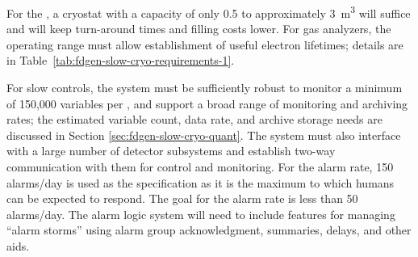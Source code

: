 For the , a cryostat with a capacity of only \num{0.5} to approximately \SI{3}{m^3} %
will suffice and will keep turn-around times and filling costs %
lower. %
For gas analyzers, the operating range must allow establishment of useful electron lifetimes;
details  are in Table~\ref{tab:fdgen-slow-cryo-requirements-1}.

For slow controls, the system must
be sufficiently robust to monitor 
a minimum of 150,000 variables per , and 
support a broad range of monitoring and archiving rates;
the estimated variable count, data rate, and archive storage needs
are discussed in Section \ref{sec:fdgen-slow-cryo-quant}.
The system must also
interface with a large number of detector subsystems and
establish two-way communication with them for control and monitoring. 
For the alarm rate, 150 alarms/day is used as the specification as it is the maximum to which humans can be expected to respond. The goal for the alarm rate is less than 50 alarms/day. The alarm logic system will need to include features for managing ``alarm storms'' using alarm group acknowledgment, summaries, delays, and other aids.





